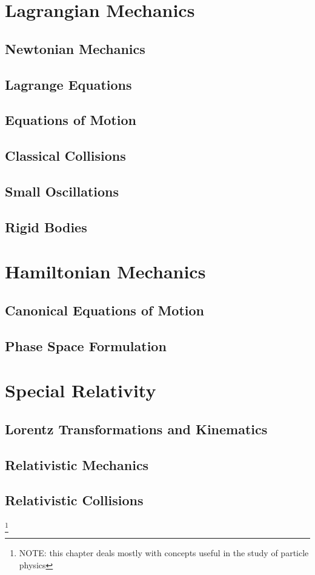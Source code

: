 \documentclass{book}
\theoremstyle{definition}
\theoremstyle{remark}
\begin{document}

\tableofcontents
\part{Lagrangian Mechanics}
\chapter{Newtonian Mechanics}

\chapter{Lagrange Equations}

\chapter{Equations of Motion}

\chapter{Classical Collisions}

\chapter{Small Oscillations}

\chapter{Rigid Bodies}

\part{Hamiltonian Mechanics}
\chapter{Canonical Equations of Motion}

\chapter{Phase Space Formulation}

\part{Special Relativity}
\chapter{Lorentz Transformations and Kinematics}

\chapter{Relativistic Mechanics}

\chapter{Relativistic Collisions}\footnote{NOTE: this chapter deals mostly with concepts useful in the study of particle physics}

\nocite{landau1,landau2,relativita,relativitat,goldsteincm,raducm}
\printbibliography
\end{document}
